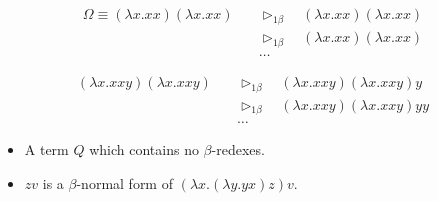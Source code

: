 \documentclass{beamer}
\newcommand{\contract}{\ensuremath{\triangleright_{1\beta}}}
\begin{document}

\begin{frame}

  \begin{example}
    \begin{align*}
      \Omega \equiv (\lambda{x}.xx)(\lambda{x}.xx)
      &\quad\contract\quad (\lambda{x}.xx)(\lambda{x}.xx)\\
      &\quad\contract\quad (\lambda{x}.xx)(\lambda{x}.xx)\\
      &\quad\dots
    \end{align*}
  \end{example}
\end{frame}


\begin{frame}

  \begin{example}
    \begin{align*}
      (\lambda{x}.xxy)(\lambda{x}.xxy)
      &\quad\contract\quad (\lambda{x}.xxy)(\lambda{x}.xxy)y\\
      &\quad\contract\quad (\lambda{x}.xxy)(\lambda{x}.xxy)yy\\
      &\quad\dots
    \end{align*}
  \end{example}
\end{frame}


\begin{frame}

  \begin{definition}
    \begin{itemize}
    \item
      A term $Q$ which contains no $\beta$-redexes.
    \end{itemize}
  \end{definition}
\end{frame}


\begin{frame}

  \begin{example}
    \begin{itemize}
    \item
      $zv$ is a $\beta$-normal form of $(\lambda{x}.(\lambda{y}.yx)z)v$.
    \end{itemize}
  \end{example}
\end{frame}
\end{document}
